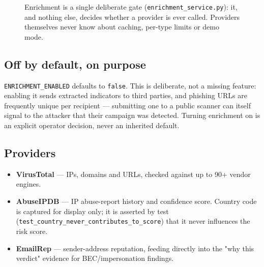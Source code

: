 \documentclass[11pt,a4paper]{article}
\begin{document}
\begin{figure}[h]
\centering
{}
\caption{Enrichment is a single deliberate gate (\texttt{enrichment\_service.py}): it, and
nothing else, decides whether a provider is ever called. Providers themselves never know
about caching, per-type limits or demo mode.}
\end{figure}

\subsection{Off by default, on purpose}
\texttt{ENRICHMENT\_ENABLED} defaults to \texttt{false}. This is deliberate, not a missing
feature: enabling it sends extracted indicators to third parties, and phishing URLs are
frequently unique per recipient — submitting one to a public scanner can itself signal to the
attacker that their campaign was detected. Turning enrichment on is an explicit operator
decision, never an inherited default.

\subsection{Providers}
\begin{itemize}[leftmargin=1.4em]
  \item \textbf{VirusTotal} — IPs, domains and URLs, checked against up to 90+ vendor engines.
  \item \textbf{AbuseIPDB} — IP abuse-report history and confidence score. Country code is
    captured for display only; it is asserted by test
    (\texttt{test\_country\_never\_contributes\_to\_score}) that it never influences the risk
    score.
  \item \textbf{EmailRep} — sender-address reputation, feeding directly into the "why this
    verdict" evidence for BEC/impersonation findings.
\end{itemize}
\end{document}
